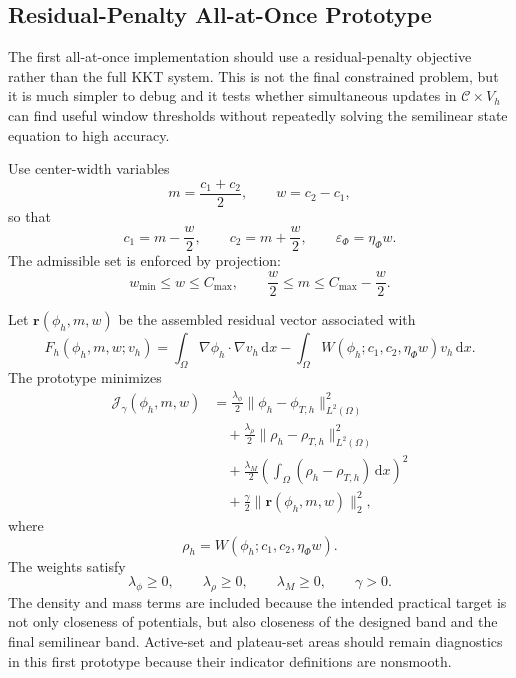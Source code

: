 \documentclass[11pt]{article}
\newcommand{\dd}{\,\mathrm d}
\newcommand{\OmegaD}{\Omega}
\newcommand{\W}{W}
\newcommand{\epsp}{\varepsilon_\Phi}
\begin{document}
\subsection{Residual-Penalty All-at-Once Prototype}

The first all-at-once implementation should use a residual-penalty objective
rather than the full KKT system.  This is not the final constrained problem,
but it is much simpler to debug and it tests whether simultaneous updates in
\(\mathcal C\times V_h\) can find useful window thresholds without repeatedly
solving the semilinear state equation to high accuracy.

Use center-width variables
\[
  m=\frac{c_1+c_2}{2},
  \qquad
  w=c_2-c_1,
\]
so that
\[
  c_1=m-\frac{w}{2},
  \qquad
  c_2=m+\frac{w}{2},
  \qquad
  \epsp=\eta_\Phi w.
\]
The admissible set is enforced by projection:
\[
  w_{\min}\le w\le C_{\max},
  \qquad
  \frac{w}{2}\le m\le C_{\max}-\frac{w}{2}.
\]

Let \(\bm r(\phi_h,m,w)\) be the assembled residual vector associated with
\[
  F_h(\phi_h,m,w;v_h)
  =
  \int_{\OmegaD}\nabla\phi_h\cdot\nabla v_h\dd x
  -
  \int_{\OmegaD}\W(\phi_h;c_1,c_2,\eta_\Phi w)v_h\dd x.
\]
The prototype minimizes
\[
  \boxed{
  \begin{aligned}
  \mathcal J_\gamma(\phi_h,m,w)
  &=
  \frac{\lambda_\phi}{2}
  \|\phi_h-\phi_{T,h}\|_{L^2(\OmegaD)}^2\\
  &\quad+
  \frac{\lambda_\rho}{2}
  \|\rho_h-\rho_{T,h}\|_{L^2(\OmegaD)}^2\\
  &\quad+
  \frac{\lambda_M}{2}
  \left(\int_{\OmegaD}(\rho_h-\rho_{T,h})\dd x\right)^2\\
  &\quad+
  \frac{\gamma}{2}\|\bm r(\phi_h,m,w)\|_2^2,
  \end{aligned}
  }
\]
where
\[
  \rho_h=\W(\phi_h;c_1,c_2,\eta_\Phi w).
\]
The weights satisfy
\[
  \lambda_\phi\ge0,\qquad
  \lambda_\rho\ge0,\qquad
  \lambda_M\ge0,\qquad
  \gamma>0.
\]
The density and mass terms are included because the intended practical target
is not only closeness of potentials, but also closeness of the designed band
and the final semilinear band.  Active-set and plateau-set areas should remain
diagnostics in this first prototype because their indicator definitions are
nonsmooth.
\end{document}
